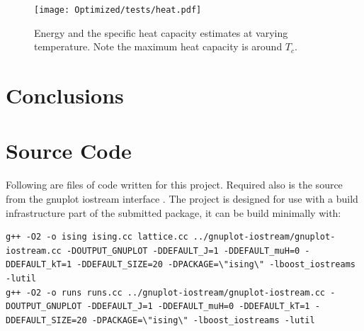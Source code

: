 \documentclass[12pt,a4paper,english]{article}
\begin{document}
\begin{figure}
\center
\texttt{[image: Optimized/tests/heat.pdf]}
\caption{Energy and the specific heat capacity estimates at varying temperature. Note the maximum heat capacity is around $T_c$.}\label{fig:heat}
\end{figure}



\section{Conclusions}
\label{sec:conclusions}




\appendix

\section{Source Code}
\label{sec:source-code}

Following are files of code written for this project. Required also is the source from the gnuplot iostream interface \cite{gnuplot-iostream}.  The project is designed for use with a build infrastructure part of the submitted package, it can be build minimally with:
\begin{lstlisting}
g++ -O2 -o ising ising.cc lattice.cc ../gnuplot-iostream/gnuplot-iostream.cc -DOUTPUT_GNUPLOT -DDEFAULT_J=1 -DDEFAULT_muH=0 -DDEFAULT_kT=1 -DDEFAULT_SIZE=20 -DPACKAGE=\"ising\" -lboost_iostreams -lutil
g++ -O2 -o runs runs.cc ../gnuplot-iostream/gnuplot-iostream.cc -DOUTPUT_GNUPLOT -DDEFAULT_J=1 -DDEFAULT_muH=0 -DDEFAULT_kT=1 -DDEFAULT_SIZE=20 -DPACKAGE=\"ising\" -lboost_iostreams -lutil
\end{lstlisting}

\lstset{language=C++}




\end{document}
